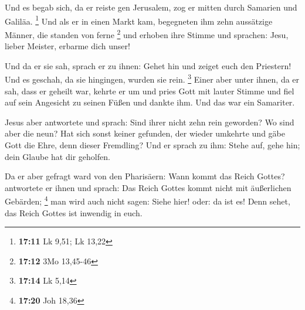  Und es begab sich, da er reiste gen Jerusalem, zog er
mitten durch Samarien und Galiläa. \footnote{\textbf{17:11} Lk 9,51; Lk
  13,22}  Und als er in einen Markt kam, begegneten ihm
zehn aussätzige Männer, die standen von ferne \footnote{\textbf{17:12}
  3Mo 13,45-46}  und erhoben ihre Stimme und sprachen:
Jesu, lieber Meister, erbarme dich unser!

 Und da er sie sah, sprach er zu ihnen: Gehet hin und
zeiget euch den Priestern! Und es geschah, da sie hingingen, wurden sie
rein. \footnote{\textbf{17:14} Lk 5,14}  Einer aber unter
ihnen, da er sah, dass er geheilt war, kehrte er um und pries Gott mit
lauter Stimme  und fiel auf sein Angesicht zu seinen Füßen
und dankte ihm. Und das war ein Samariter.

 Jesus aber antwortete und sprach: Sind ihrer nicht zehn
rein geworden? Wo sind aber die neun?  Hat sich sonst
keiner gefunden, der wieder umkehrte und gäbe Gott die Ehre, denn dieser
Fremdling?  Und er sprach zu ihm: Stehe auf, gehe hin; dein
Glaube hat dir geholfen.

 Da er aber gefragt ward von den Pharisäern: Wann kommt das
Reich Gottes? antwortete er ihnen und sprach: Das Reich Gottes kommt
nicht mit äußerlichen Gebärden; \footnote{\textbf{17:20} Joh 18,36}
 man wird auch nicht sagen: Siehe hier! oder: da ist es!
Denn sehet, das Reich Gottes ist inwendig in euch.

